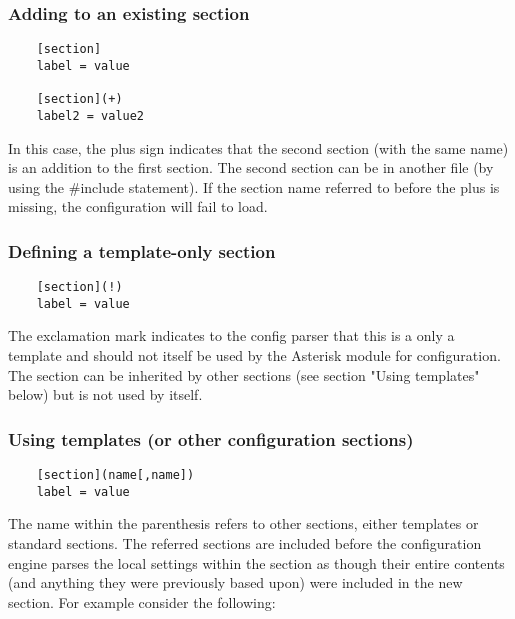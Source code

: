 \subsubsection{Adding to an existing section}
\begin{astlisting}
\begin{verbatim}
	[section]
	label = value
	
	[section](+)
	label2 = value2	
\end{verbatim}	
\end{astlisting}

In this case, the plus sign indicates that the second section (with the
same name) is an addition to the first section. The second section can
be in another file (by using the \#include statement). If the section
name referred to before the plus is missing, the configuration will fail
to load.

\subsubsection{Defining a template-only section}
\begin{astlisting}
\begin{verbatim}
	[section](!)
	label = value
\end{verbatim}
\end{astlisting}

The exclamation mark indicates to the config parser that this is a only
a template and should not itself be used by the Asterisk module for
configuration. The section can be inherited by other sections (see
section "Using templates" below) but is not used by itself.

\subsubsection{Using templates (or other configuration sections)}
\begin{astlisting}
\begin{verbatim}
	[section](name[,name])
	label = value
\end{verbatim}
\end{astlisting}

The name within the parenthesis refers to other sections, either
templates or standard sections. The referred sections are included
before the configuration engine parses the local settings within the
section as though their entire contents (and anything they were
previously based upon) were included in the new section.  For example
consider the following:

